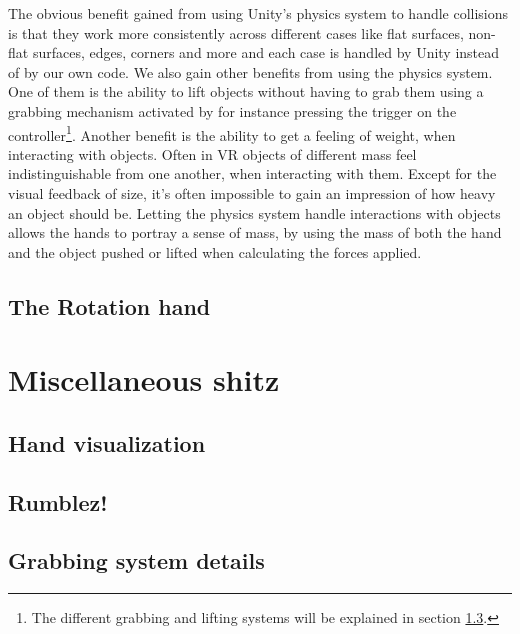 The obvious benefit gained from using Unity's physics system to handle collisions is that they work more consistently across different cases like flat surfaces, non-flat surfaces, edges, corners and more and each case is handled by Unity instead of by our own code. We also gain other benefits from using the physics system. One of them is the ability to lift objects without having to grab them using a grabbing mechanism activated by for instance pressing the trigger on the controller\footnote{The different grabbing and lifting systems will be explained in section \ref{subsec:grabbingSystem}.}. Another benefit is the ability to get a feeling of weight, when interacting with objects. Often in VR objects of different mass feel indistinguishable from one another, when interacting with them. Except for the visual feedback of size, it's often impossible to gain an impression of how heavy an object should be. Letting the physics system handle interactions with objects allows the hands to portray a sense of mass, by using the mass of both the hand and the object pushed or lifted when calculating the forces applied.


\subsection{The Rotation hand}
\label{subsec:slidingRigidHand}

\section{Miscellaneous shitz}
\label{sec:MISCELLANEOUSSHITZ}

\subsection{Hand visualization}
\label{subsec:handVisualization}

\subsection{Rumblez!}
\label{subsec:RUMLBEZ}

\subsection{Grabbing system details}
\label{subsec:grabbingSystem}